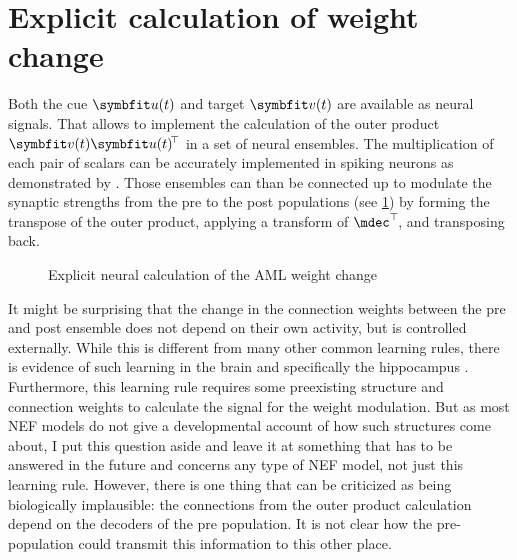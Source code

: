 \section{Explicit calculation of weight change}
Both the cue $\vc u(t)$ and target $\vc v(t)$ are available as neural signals.
That allows to implement the calculation of the outer product $\vc v(t) \vc u(t)\!\Tr$ in a set of neural ensembles.
The multiplication of each pair of scalars can be accurately implemented in spiking neurons as demonstrated by \textcite{gosmann2015-1}.
Those ensembles can than be connected up to modulate the synaptic strengths from the pre to the post populations (see \cref{fig:aml-explicit}) by forming the transpose of the outer product, applying a transform of $\mdec\Tr\!$, and transposing back.
\begin{figure}
    \centering
    \caption{Explicit neural calculation of the AML weight change}\label{fig:aml-explicit}
\end{figure}

It might be surprising that the change in the connection weights between the pre and post ensemble does not depend on their own activity, but is controlled externally.
While this is different from many other common learning rules, there is evidence of such learning in the brain and specifically the hippocampus \parencite{huilme2014,rebola2017,uchida2012}.
Furthermore, this learning rule requires some preexisting structure and connection weights to calculate the signal for the weight modulation.
But as most NEF models do not give a developmental account of how such structures come about, I put this question aside and leave it at something that has to be answered in the future and concerns any type of NEF model, not just this learning rule.
However, there is one thing that can be criticized as being biologically implausible: the connections from the outer product calculation depend on the decoders of the pre population.
It is not clear how the pre-population could transmit this information to this other place.

